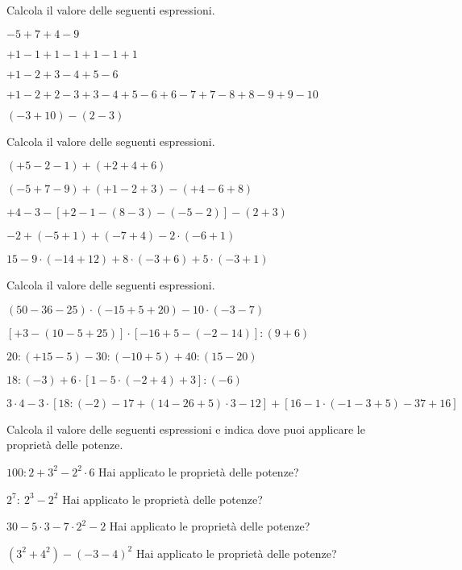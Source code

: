 \begin{esercizio}[\Ast]
Calcola il valore delle seguenti espressioni.
 \begin{enumeratea}
 \item \(-5+7+4-9\)
 \item \(+1-1+1-1+1-1+1\)
 \item \(+1-2+3-4+5-6\)
 \item \(+1-2+2-3+3-4+5-6+6-7+7-8+8-9+9-10\)
 \item \((-3+10)-(2-3)\)
 \end{enumeratea}
\end{esercizio}

\begin{esercizio}[\Ast]
Calcola il valore delle seguenti espressioni.
 \begin{enumeratea}
 \item \((+5-2-1)+(+2+4+6)\)
 \item \((-5+7-9)+(+1-2+3)-(+4-6+8)\)
 \item \(+4-3-[+2-1-(8-3)-(-5-2)]-(2+3)\)
 \item \(-2+(-5+1)+(-7+4)-2 \cdot (-6+1)\)
 \item \(15-9 \cdot (-14+12)+8 \cdot (-3+6)+ 5 \cdot(-3+1)\)
 \end{enumeratea}
\end{esercizio}

\begin{esercizio}[\Ast]
Calcola il valore delle seguenti espressioni.
 \begin{enumeratea}
 \item \((50-36-25)\cdot (-15+5+20)-10\cdot (-3-7)\)
 \item \([+3-(10-5+25)]\cdot [-16+5-(-2-14)]:(9+6)\)
 \item \(20:(+15-5)-30:(-10+5)+40:(15-20)\)
 \item \(18:(-3)+6\cdot [1-5\cdot (-2+4)+3]: (-6)\)
 \item \(3\cdot 4-3\cdot [18:(-2)-17+(14-26+5)\cdot 3-12]+[16-1\cdot 
(-1-3+5)-37+16]\)
\end{enumeratea}
\end{esercizio}

\begin{esercizio}[\Ast]
Calcola il valore delle seguenti espressioni e indica dove puoi applicare le 
proprietà delle potenze.
\TabPositions{3.5cm}
\begin{enumeratea}
 \item \(100:2+3^2 -2^2\cdot 6\) \tab Hai applicato le proprietà delle 
potenze?\enspace\dotfill
 \item \(2^7:~2^3 -2^2\) \tab Hai applicato le proprietà delle 
potenze?\enspace\dotfill
 \item \(30-5\cdot 3 -7\cdot 2^2 -2\) \tab Hai applicato le proprietà delle 
potenze?\enspace\dotfill
 \item \((3^2 +4^2) -(-3-4)^2\) \tab Hai applicato le proprietà delle 
potenze?\enspace\dotfill
\end{enumeratea}
\end{esercizio}

